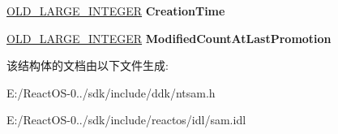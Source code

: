 \begin{DoxyCompactItemize}
\hyperlink{struct___o_l_d___l_a_r_g_e___i_n_t_e_g_e_r}{O\+L\+D\+\_\+\+L\+A\+R\+G\+E\+\_\+\+I\+N\+T\+E\+G\+ER} {\bfseries Creation\+Time}
\item 
\mbox{\label{struct___d_o_m_a_i_n___m_o_d_i_f_i_e_d___i_n_f_o_r_m_a_t_i_o_n2_a76e7bcfd1dcbb721e80af1c607b4ba70}} 
\hyperlink{struct___o_l_d___l_a_r_g_e___i_n_t_e_g_e_r}{O\+L\+D\+\_\+\+L\+A\+R\+G\+E\+\_\+\+I\+N\+T\+E\+G\+ER} {\bfseries Modified\+Count\+At\+Last\+Promotion}
\end{DoxyCompactItemize}


该结构体的文档由以下文件生成\+:\begin{DoxyCompactItemize}
\item 
E\+:/\+React\+O\+S-\/0../sdk/include/ddk/ntsam.\+h\item 
E\+:/\+React\+O\+S-\/0../sdk/include/reactos/idl/sam.\+idl\end{DoxyCompactItemize}
